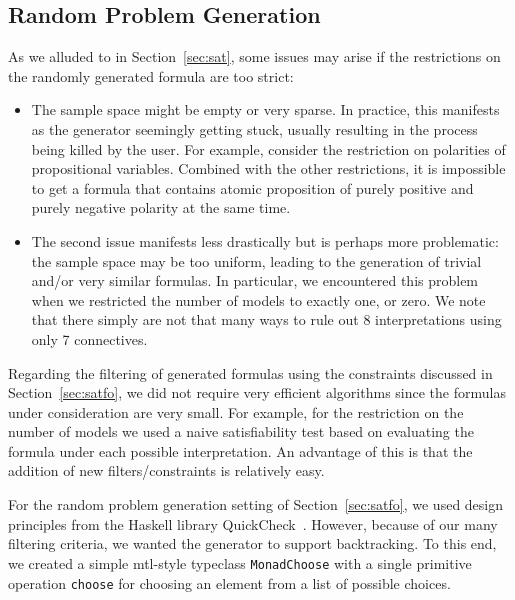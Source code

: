 \subsection{Random Problem Generation}\label{appB:SAT}

As we alluded to in Section~\ref{sec:sat},
some issues may arise if the restrictions on the randomly generated formula are too strict:
\begin{itemize}
    \item
        The sample space might be empty or very sparse.
        In practice, this manifests as the generator seemingly getting stuck,
        usually resulting in the process being killed by the user. 
        For example,
        consider the restriction on polarities of propositional
        variables. %
        Combined with the other restrictions,
        it is impossible to get a formula that contains atomic proposition
        of purely positive and purely negative polarity at the same time.

    \item
        The second issue manifests less drastically but is perhaps more problematic:
        the sample space may be too uniform,
        leading to the generation of trivial and/or very similar
        formulas. 
        In particular, we encountered this problem
        when we restricted the number of models to exactly one, or zero.
        We note that there simply are not that many ways to rule out 8 interpretations
        using only 7 connectives.
\end{itemize}





Regarding the filtering of generated formulas using the constraints discussed in Section~\ref{sec:satfo},
we did not require very efficient algorithms since
the formulas under consideration are very small.
For example, for the restriction on the number of models we used a naive satisfiability test
based on evaluating the formula under each possible interpretation.
An advantage of this is that the addition of new filters/constraints is relatively easy.




For the random problem generation setting of Section~\ref{sec:satfo},
we used design principles from the Haskell library
QuickCheck~\cite{ClaessenHughes:2000:QuickCheck}.
However, because of our many filtering criteria, we wanted the generator to support backtracking.
To this end,
we created a simple mtl-style typeclass \texttt{MonadChoose}
with a single primitive operation \texttt{choose} for choosing an element from a list of possible choices.

